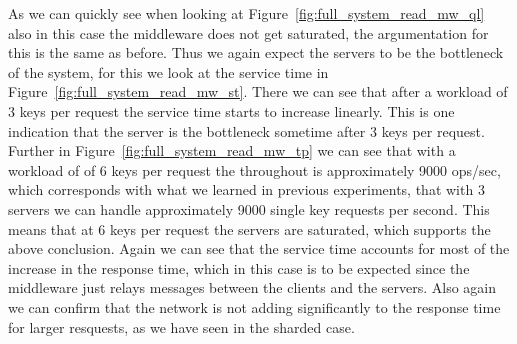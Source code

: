 \documentclass[11pt,a4paper]{article}
\begin{document}
%
As we can quickly see when looking at Figure~\ref{fig:full_system_read_mw_ql} also in this case the middleware does not get saturated, the argumentation for this is the same as before.
%
Thus we again expect the servers to be the bottleneck of the system, for this we look at the service time in Figure~\ref{fig:full_system_read_mw_st}.
%
There we can see that after a workload of 3 keys per request the service time starts to increase linearly.
%
This is one indication that the server is the bottleneck sometime after 3 keys per request. 
%
Further in Figure~\ref{fig:full_system_read_mw_tp} we can see that with a workload of of 6 keys per request the throughout is approximately 9000 ops/sec, which corresponds with what we learned in previous experiments, that with 3 servers we can handle approximately 9000 single key requests per second.
%
This means that at 6 keys per request the servers are saturated, which supports the above conclusion.
%
Again we can see that the service time accounts for most of the increase in the response time, which in this case is to be expected since the middleware just relays messages between the clients and the servers.
%
Also again we can confirm that the network is not adding significantly to the response time for larger resquests, as we have seen in the sharded case.
%
\end{document}
